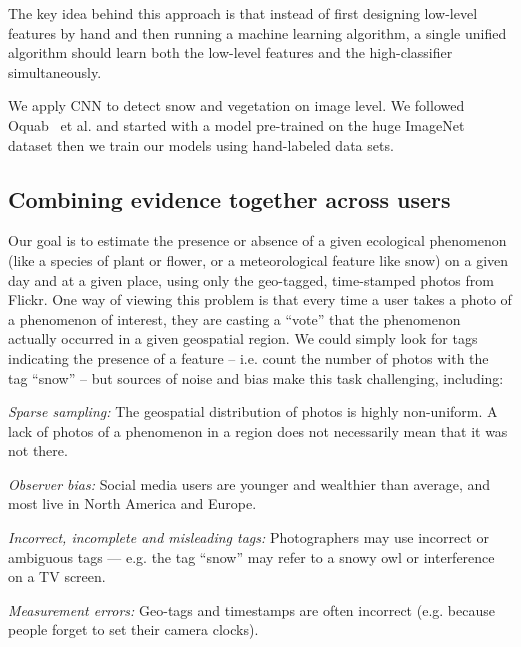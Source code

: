 The key idea behind this approach is that instead of first designing low-level features by
hand and then running a machine learning algorithm, a single unified
algorithm should learn both the low-level features and the
high-classifier simultaneously. 

We apply CNN to detect snow and vegetation on image level. We followed Oquab~\cite{Oquab14} et al. and started with a model pre-trained on the huge ImageNet dataset then we train our models using hand-labeled data sets.
 



\subsection{Combining evidence together across users}

Our goal is to estimate the presence or absence of a given ecological
phenomenon (like a species of plant or flower, or a meteorological
feature like snow) on a given day and at a given place,
using only the geo-tagged, time-stamped photos from Flickr. One way of viewing
this problem is that every time a user takes a photo of a phenomenon
of interest, they are casting a ``vote''  that the
phenomenon actually occurred in a given geospatial region. 
 We could
simply look for tags indicating the presence of a feature --
i.e. count the number of photos with the tag ``snow'' --  
but sources of noise and bias make this task 
challenging, including:
\begin{packed_itemize}
\item[---] \textit{Sparse sampling:} The geospatial distribution of photos
  is highly non-uniform. A lack of photos
  of a phenomenon in a region does not
  necessarily mean that it was not there. 
\item[---] \textit{Observer bias:} Social media users are younger and
  wealthier than average, and most live in North
  America and Europe.
\item[---] \textit{Incorrect, incomplete and misleading tags:}
  Photographers may use incorrect or ambiguous tags  ---
  e.g. the tag ``snow'' may refer to a snowy owl or interference on a
  TV screen.
\item[---] \textit{Measurement errors:} Geo-tags and timestamps are
  often incorrect (e.g. because people   forget to set their camera clocks).
\end{packed_itemize}

